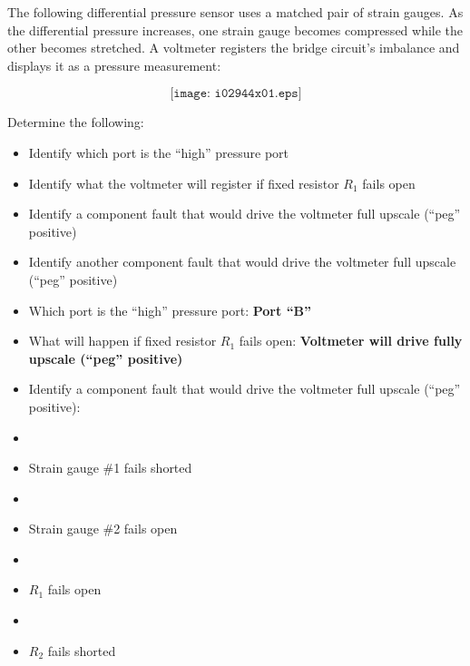 

The following differential pressure sensor uses a matched pair of strain gauges.  As the differential pressure increases, one strain gauge becomes compressed while the other becomes stretched.  A voltmeter registers the bridge circuit's imbalance and displays it as a pressure measurement:

$$\texttt{[image: i02944x01.eps]}$$

\vskip 10pt

\noindent
Determine the following:

\begin{itemize}
\item{} Identify which port is the ``high'' pressure port
\item{} Identify what the voltmeter will register if fixed resistor $R_1$ fails open
\item{} Identify a component fault that would drive the voltmeter full upscale (``peg'' positive)
\item{} Identify another component fault that would drive the voltmeter full upscale (``peg'' positive)
\end{itemize}







\begin{itemize}
\item{} Which port is the ``high'' pressure port: {\bf Port ``B''}
\item{} What will happen if fixed resistor $R_1$ fails open: {\bf Voltmeter will drive fully upscale (``peg'' positive)}
\item{} Identify a component fault that would drive the voltmeter full upscale (``peg'' positive):
\item\item{} Strain gauge \#1 fails shorted
\item\item{} Strain gauge \#2 fails open
\item\item{} $R_1$ fails open
\item\item{} $R_2$ fails shorted
\end{itemize}

